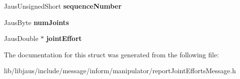 \begin{DoxyCompactItemize}
\item 
\hypertarget{struct_report_joint_efforts_message_struct_a28e337dc95617aaa05a90b9a1a1bb65c}{\-Jaus\-Unsigned\-Short {\bfseries sequence\-Number}}\label{struct_report_joint_efforts_message_struct_a28e337dc95617aaa05a90b9a1a1bb65c}

\item 
\hypertarget{struct_report_joint_efforts_message_struct_a731ad7a42ced3e44f98577efcbe56af4}{\-Jaus\-Byte {\bfseries num\-Joints}}\label{struct_report_joint_efforts_message_struct_a731ad7a42ced3e44f98577efcbe56af4}

\item 
\hypertarget{struct_report_joint_efforts_message_struct_a19b3b9100bccf2128ccfcd9696ca1539}{\-Jaus\-Double $\ast$ {\bfseries joint\-Effort}}\label{struct_report_joint_efforts_message_struct_a19b3b9100bccf2128ccfcd9696ca1539}

\end{DoxyCompactItemize}


\-The documentation for this struct was generated from the following file\-:\begin{DoxyCompactItemize}
\item 
lib/libjaus/include/message/inform/manipulator/report\-Joint\-Efforts\-Message.\-h\end{DoxyCompactItemize}
